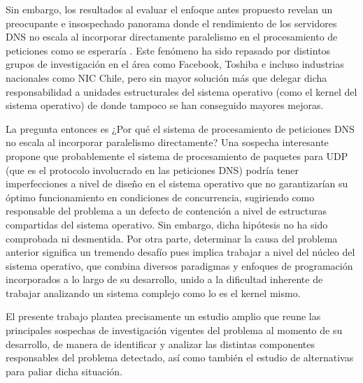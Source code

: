 \begin{intro}
Sin embargo, los resultados al evaluar el enfoque antes propuesto revelan un preocupante e insospechado panorama donde el rendimiento de los servidores DNS no escala al incorporar directamente paralelismo en el procesamiento de peticiones como se esperaría \cite{tesis:diegoDCC}. Este fenómeno ha sido repasado por distintos grupos de investigación en el área como Facebook, Toshiba \cite{post:facebook, paper:toshiba} e incluso industrias nacionales como NIC Chile, pero sin mayor solución más que delegar dicha responsabilidad a unidades estructurales del sistema operativo (como el kernel del sistema operativo) de donde tampoco se han conseguido mayores mejoras.

La pregunta entonces es ¿Por qué el sistema de procesamiento de peticiones DNS no escala al incorporar paralelismo directamente? Una sospecha interesante propone que probablemente el sistema de procesamiento de paquetes para UDP (que es el protocolo involucrado en las peticiones DNS) podría tener imperfecciones a nivel de diseño en el sistema operativo que no garantizarían su óptimo funcionamiento en condiciones de concurrencia, sugiriendo como responsable del problema a un defecto de contención a nivel de estructuras compartidas del sistema operativo. Sin embargo, dicha hipótesis no ha sido comprobada ni desmentida. Por otra parte, determinar la causa del problema anterior significa un tremendo desafío pues implica trabajar a nivel del núcleo del sistema operativo, que combina diversos paradigmas y enfoques de programación incorporados a lo largo de su desarrollo, unido a la dificultad inherente de trabajar analizando un sistema complejo como lo es el kernel mismo.

El presente trabajo plantea precisamente un estudio amplio que reune las principales sospechas de investigación vigentes del problema al momento de su desarrollo, de manera de identificar y analizar las distintas componentes responsables del problema detectado, así como también el estudio de alternativas para paliar dicha situación.


\end{intro}